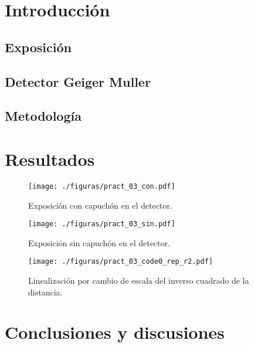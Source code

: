 \newlength{\strutheight}
\settoheight{\strutheight}{\strut}
\begin{multicols}{2}

  \section{Introducción}
  \subsection{Exposición \texorpdfstring{}{TEXT}}

  \citep{detec1}


  \subsection{Detector Geiger Muller}

  \subsection{Metodología}

  \section{Resultados}

  \begin{figure}[H]
    \centering
    \texttt{[image: ./figuras/pract\_03\_con.pdf]}
    \caption{Exposición con capuchón en el detector.}
    \label{fig:pract_03_con}
  \end{figure}

  \begin{figure}[H]
    \centering
    \texttt{[image: ./figuras/pract\_03\_sin.pdf]}
    \caption{Exposición sin capuchón en el detector.}
    \label{fig:pract_03_sin}
  \end{figure}


  \begin{figure}[H]
    \centering
    \texttt{[image: ./figuras/pract\_03\_code0\_rep\_r2.pdf]}
    \caption{Linealización por cambio de escala del inverso cuadrado de la distancia.}
    \label{fig:pract_r2}
  \end{figure}


  \section{Conclusiones y discusiones} 


\small{
}
\end{multicols}








